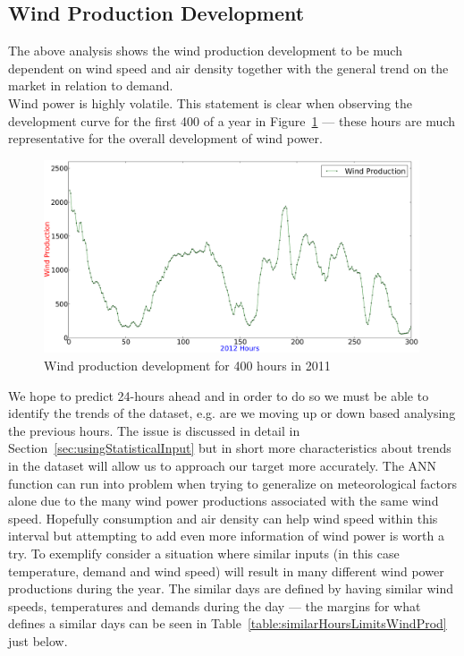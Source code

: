 \subsection{Wind Production Development}
\label{sec:windProductionDev}
The above analysis shows the wind production development to be much dependent on wind speed and air density together with the general trend on the market in relation to demand. 
\\[0.5cm]
Wind power is highly volatile. This statement is clear when observing the development curve for the first 400 of a year in Figure~\ref{fig:windHourDevelopment400Hours} --- these hours are much representative for the overall development of wind power. 

\begin{figure}[H]
\centering
\includegraphics[width=0.99\textwidth]{billeder/productionTendency400Hours.png}
\caption{Wind production development for 400 hours in 2011}
\label{fig:windHourDevelopment400Hours}
\end{figure}

\noindent We hope to predict 24-hours ahead and in order to do so we must be able to identify the trends of the dataset, e.g. are we moving up or down based analysing the previous hours. The issue is discussed in detail in Section~\ref{sec:usingStatisticalInput} but in short more characteristics about trends in the dataset will allow us to approach our target more accurately. The ANN function can run into problem when trying to generalize on meteorological factors alone due to the many wind power productions associated with the same wind speed. Hopefully consumption and air density can help wind speed within this interval but attempting to add even more information of wind power is worth a try. To exemplify consider a situation where similar inputs (in this case temperature, demand and wind speed) will result in many different wind power productions during the year. The similar days are defined by having similar wind speeds, temperatures and demands during the day --- the margins for what defines a similar days can be seen in Table~\ref{table:similarHoursLimitsWindProd} just below.

